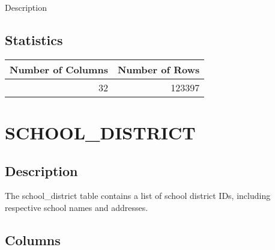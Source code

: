 \documentclass[
  letterpaper,
  DIV=11,
  numbers=noendperiod]{scrreprt}
\begin{document}
Description

\hypertarget{statistics-34}{%
\section*{Statistics}\label{statistics-34}}

\begin{longtable}{rr}
\toprule
Number of Columns & Number of Rows \\ 
\midrule
32 & 123397 \\ 
\bottomrule
\end{longtable}

\hypertarget{school_district}{%
\chapter*{SCHOOL\_DISTRICT}\label{school_district}}

\hypertarget{description-35}{%
\section*{Description}\label{description-35}}

The school\_district table contains a list of school district IDs,
including respective school names and addresses.

\hypertarget{columns-35}{%
\section*{Columns}\label{columns-35}}
\end{document}

